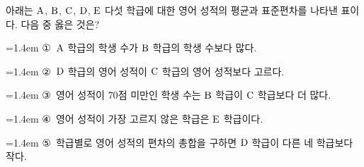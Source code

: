 아래는 $\mathrm{A}$, $\mathrm{B}$, $\mathrm{C}$, $\mathrm{D}$, $\mathrm{E}$ 다섯 학급에 대한 영어 성적의 평균과 표준편차를 나타낸 표이다. 다음 중 옳은 것은?
\par\smallskip\begin{center}\resizebox{\ifdim\width>\linewidth\linewidth\else\width\fi}{!}{}\end{center}
\par\medskip\par\noindent\hangindent=1.4em {\small ①}\ $\mathrm{A}$ 학급의 학생 수가 $\mathrm{B}$ 학급의 학생 수보다 많다.\par\noindent\hangindent=1.4em {\small ②}\ $\mathrm{D}$ 학급의 영어 성적이 $\mathrm{C}$ 학급의 영어 성적보다 고르다.\par\noindent\hangindent=1.4em {\small ③}\ 영어 성적이 $70$점 미만인 학생 수는 $\mathrm{B}$ 학급이 $\mathrm{C}$ 학급보다 더 많다.\par\noindent\hangindent=1.4em {\small ④}\ 영어 성적이 가장 고르지 않은 학급은 $\mathrm{E}$ 학급이다.\par\noindent\hangindent=1.4em {\small ⑤}\ 학급별로 영어 성적의 편차의 총합을 구하면 $\mathrm{D}$ 학급이 다른 네 학급보다 작다.\par\medskip
